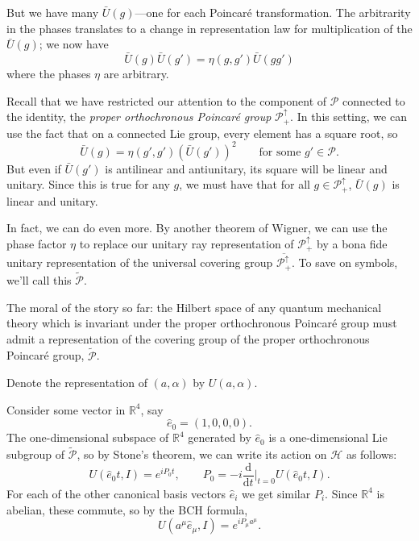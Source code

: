 \documentclass[a4paper]{report}
\newcommand{\tder}[2]{\frac{\text{d} #1}{\text{d} #2}}
\newcommand{\R}{\mathbb{R}}
\theoremstyle{definition}
\theoremstyle{plain}
\theoremstyle{remark}
\begin{document}
But we have many $\bar{U}(g)$---one for each Poincar{\'e} transformation. The arbitrarity in the phases translates to a change in representation law for multiplication of the $\bar{U}(g)$; we now have 
\begin{equation*}
  \bar{U}(g) \bar{U}(g') = \eta(g, g')\bar{U}(gg')
\end{equation*}
where the phases $\eta$ are arbitrary.

Recall that we have restricted our attention to the component of $\mathcal{P}$ connected to the identity, the \emph{proper orthochronous Poincar{\'e} group} $\mathcal{P}_{+}^{\uparrow}$. In this setting, we can use the fact that on a connected Lie group, every element has a square root, so
\begin{equation*}
  \bar{U}(g) = \eta(g',g')(\bar{U}(g'))^{2}\qquad\text{for some }g' \in \mathcal{P}.
\end{equation*}
But even if $\bar{U}(g')$ is antilinear and antiunitary, its square will be linear and unitary. Since this is true for any $g$, we must have that for all $g \in \mathcal{P}_{+}^{\uparrow}$, $\bar{U}(g)$ is linear and unitary.

In fact, we can do even more. By another theorem of Wigner, we can use the phase factor $\eta$ to replace our unitary ray representation of $\mathcal{P}_{+}^{\uparrow}$ by a bona fide unitary representation of the universal covering group $\overline{\mathcal{P}_{+}^{\uparrow}}$. To save on symbols, we'll call this $\widetilde{\mathcal{P}}$.

The moral of the story so far: the Hilbert space of any quantum mechanical theory which is invariant under the proper orthochronous Poincar{\'e} group must admit a representation of the covering group of the proper orthochronous Poincar{\'e} group, $\widetilde{\mathcal{P}}$.

Denote the representation of $(a, \alpha)$ by $U(a, \alpha)$.

Consider some vector in $\R^{4}$, say
\begin{equation*}
  \hat{e}_{0} = (1,0,0,0).
\end{equation*}
The one-dimensional subspace of $\R^{4}$ generated by $\hat{e}_{0}$ is a one-dimensional Lie subgroup of $\widetilde{\mathcal{P}}$, so by Stone's theorem, we can write its action on $\mathscr{H}$ as follows:
\begin{equation*}
  U(\hat{e}_{0} t, I) = e^{i P_{0} t},\qquad P_{0} = -i \tder{}{t}\bigg|_{t=0} U(\hat{e}_{0} t, I).
\end{equation*}
For each of the other canonical basis vectors $\hat{e}_{i}$ we get similar $P_{i}$. Since $\R^4$ is abelian, these commute, so by the BCH formula,
\begin{equation*}
  U(a^{\mu} \hat{e}_{\mu}, I) = e^{i P_{\mu} a^{\mu}}.
\end{equation*}
\end{document}

